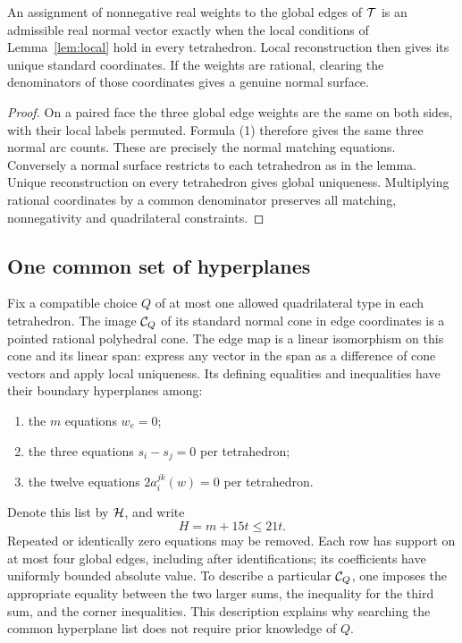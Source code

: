 \begin{proposition}
\label{prop:global}
An assignment of nonnegative real weights to the global edges of $\mathcal T$
is an admissible real normal vector exactly when the local conditions of
Lemma~\ref{lem:local} hold in every tetrahedron. Local reconstruction then
gives its unique standard coordinates. If the weights are rational,
clearing the denominators of those coordinates gives a genuine normal
surface.
\end{proposition}
\begin{proof}
On a paired face the three global edge weights are the same on both sides,
with their local labels permuted. Formula (1) therefore gives the same
three normal arc counts. These are precisely the normal matching
equations. Conversely a normal surface restricts to each tetrahedron as
in the lemma. Unique reconstruction on every tetrahedron gives global
uniqueness. Multiplying rational coordinates by a common denominator
preserves all matching, nonnegativity and quadrilateral constraints.
\end{proof}

\subsection{One common set of hyperplanes}

Fix a compatible choice $Q$ of at most one allowed quadrilateral type in
each tetrahedron. The image $\mathcal C_Q$ of its standard normal cone in edge
coordinates is a pointed rational polyhedral cone. The edge map is a
linear isomorphism on this cone and its linear span: express any vector
in the span as a difference of cone vectors and apply local uniqueness.
Its defining
equalities and inequalities have their boundary hyperplanes among:
\begin{enumerate}
\item the $m$ equations $w_e=0$;
\item the three equations $s_i-s_j=0$ per tetrahedron;
\item the twelve equations $2a_i^{jk}(w)=0$ per tetrahedron.
\end{enumerate}
Denote this list by $\mathcal H$, and write
\[
                     H=m+15t\le21t.                       \tag{3}\label{eq:H}
\]
Repeated or identically zero equations may be removed. Each row has
support on at most four global edges, including after identifications;
its coefficients have uniformly bounded absolute value. To describe a
particular $\mathcal C_Q$, one imposes the appropriate equality between the two
larger sums, the inequality for the third sum, and the corner inequalities.
This description explains why searching the common hyperplane list does
not require prior knowledge of $Q$.

